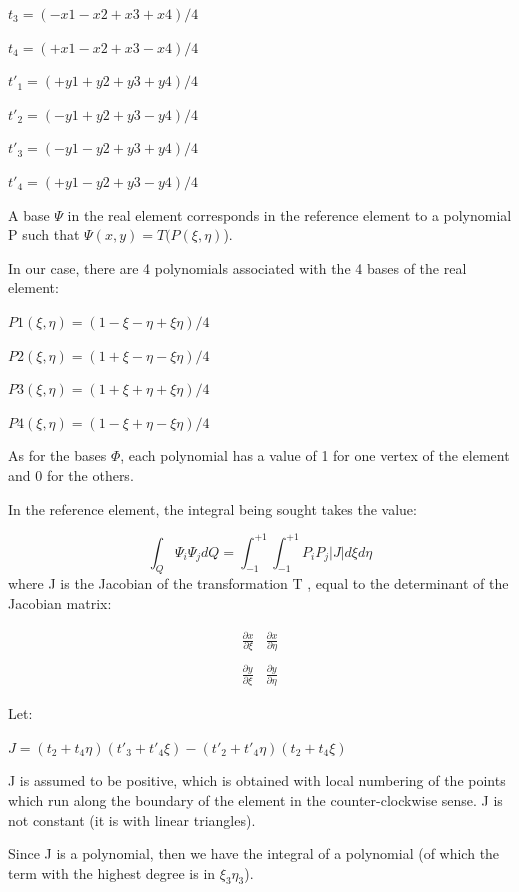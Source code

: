 $t_{3} = ( -x1 - x2 + x3 + x4 ) / 4$

$t_{4} = ( +x1 - x2 + x3 - x4 ) / 4$

$t'_{1} = ( +y1 + y2 + y3 + y4 ) / 4$

$t'_{2} = ( -y1 + y2 + y3 - y4 ) / 4$

$t'_{3} = ( -y1 - y2 + y3 + y4 ) / 4$

$t'_{4} = ( +y1 - y2 + y3 - y4 ) / 4$

A base $\Psi$ in the real element corresponds in the reference element to a
polynomial P such that $\Psi(x,y)  =  T(P(\xi,\eta)$).

In our case, there are 4 polynomials associated with the 4 bases of the real element:

$P1(\xi,\eta) = ( 1 - \xi- \eta + \xi\eta)/4$

$P2(\xi,\eta) = ( 1 + \xi- \eta - \xi\eta)/4$

$P3(\xi,\eta) = ( 1 + \xi+ \eta + \xi\eta)/4$

$P4(\xi,\eta) = ( 1 - \xi+ \eta - \xi\eta)/4$

As for the bases $\Phi$, each polynomial has a value of 1 for one vertex of the
element and 0 for the others.

In the reference element, the integral being sought takes the value:

\[\int _{Q}\Psi _{i}  \Psi _{j} dQ=\int _{-1}^{+1}\int _{-1}^{+1}P_{i} P_{j} \left|J\right|d\xi d\eta   \]
where J is the Jacobian of the transformation T , equal to the determinant of the Jacobian matrix:

\[
\begin{array}{cc}
  \frac{\partial{x}}{\partial{\xi}} & \frac{\partial{x}}{\partial{\eta}} \\
  \\
  \frac{\partial{y}}{\partial{\xi}} & \frac{\partial{y}}{\partial{\eta}}
\end{array}
\]

Let:

$J = (t_{2}+t_{4}\eta) (t'_{3}+t'_{4}\xi) - (t'_{2}+t'_{4}\eta) (t_{2}+t_{4}\xi)$

J is assumed to be positive, which is obtained with local numbering of the
points which run along the boundary of the element in the counter-clockwise
sense. J is not constant (it is with linear triangles).

Since J is a polynomial, then we have the integral of a polynomial (of which
the term with the highest degree is in $\xi _{3}\eta _{3}$).

